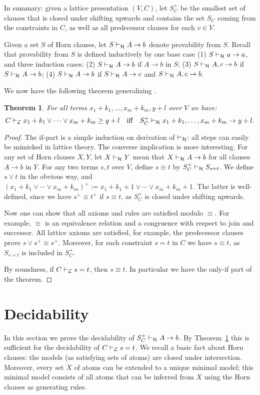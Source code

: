 \documentclass[11pt,a4paper]{article}
\newtheorem{theorem}{Theorem}[section]
\newcommand\jterm[3]{{{#1_1}+{#2_1}}\vee\cdots\vee{{#1_#3}+{#2_#3}}}
\newcommand\jbody[3]{{{#1_1}+{#2_1}},\ldots,{{#1_#3}+{#2_#3}}}
\newcommand\lathy{{\cal L}}
\newcommand\prvL{\vdash_{\lathy}}
\newcommand\prvH{\vdash_{\cal H}}
\begin{document}
In summary: given a lattice presentation $(V,C)$,
let $S^+_C$ be the smallest set of clauses that 
is closed under shifting upwards and contains
the set $S_C$ coming from the constraints in $C$,
as well as all predecessor clauses for each $v\in V$. 

Given a set $S$ of Horn clauses,
let $S\prvH A\to b$ denote provability from $S$.
Recall that provability from $S$ is defined inductively by
one base case (1) $S\prvH a\to a$, and three induction cases:
(2) $S\prvH A\to b$ if $A\to b$ in $S$;
(3) $S\prvH A,c\to b$ if $S\prvH A\to b$;
(4) $S\prvH A\to b$ if $S\prvH A\to c$ and $S\prvH A,c\to b$. 

We now have the following theorem generalizing \cite[Theorem 3]{Lorenzen51}.

\begin{theorem}\label{thm:LvsH}
For all terms $\jbody{x}{k}{m},y+l$ over $V$ we have:
\[
C\prvL \jterm{x}{k}{m}\geq y+l 
\quad\text{iff}\quad
S^+_C\prvH \jbody{x}{k}{m}\to y+l.
\]
\end{theorem} 
\begin{proof}
The if-part is a simple induction on derivation of $\prvH$:
all steps can easily be mimicked in lattice theory.
The converse implication is more interesting.
For any set of Horn clauses $X,Y$, let $X \prvH Y$ mean
that $X \prvH A\to b$ for all clauses $A\to b$ in $Y$.
For any two terms $s,t$ over $V$, define $s\equiv t$ by
$S^+_C \prvH S_{s=t}$. We define $s\vee t$ in the obvious way,
and $(\jterm{x}{k}{m})^+ := x_1+k_1+1 \vee\cdots\vee x_m+k_m+1$.
The latter is well-defined, since we have $s^+\equiv t^+$ 
if $s\equiv t$, as $S^+_C$ is closed under shifting upwards.

Now one can show that all axioms and rules are satisfied modulo $\equiv$. 
For example, $\equiv$ is an equivalence relation and
a congruence with respect to join and successor.
All lattice axioms are satisfied, for example,
the predecessor clauses prove $s\vee s^+ \equiv s^+$. 
Moreover, for each constraint $s=t$ in $C$ 
we have $s\equiv t$, as $S_{s=t}$ is included in $S^+_C$.

By soundness, if $C\prvL s=t$, then $s\equiv t$.
In particular we have the only-if part of the theorem.
\end{proof}

\section{Decidability}

In this section we prove the decidability of $S^+_C\prvH A\to b$.
By Theorem~\ref{thm:LvsH} this is sufficient for
the decidability of $C\prvL s=t$. We recall a basic fact
about Horn clauses: the models (as satisfying sets of atoms)
are closed under intersection. Moreover, every set $X$ of atoms
can be extended to a unique minimal model; this minimal model
consists of all atoms that can be inferred from $X$ using the
Horn clauses as generating rules. 
\end{document}
